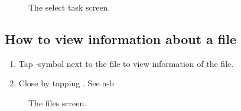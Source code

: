 \begin{figure}[htb]
\caption{The select task screen.}
\label{fig:ios_processes}
\end{figure}
\FloatBarrier

\subsection{How to view information about a file}

\begin{enumerate}
\item Tap -symbol next to the file to view information of the file.
\item Close by tapping . See a-b
\end{enumerate}

\begin{figure}[htb]
\caption{The files screen.}
\label{fig:ios_files1}
\end{figure}
\FloatBarrier


